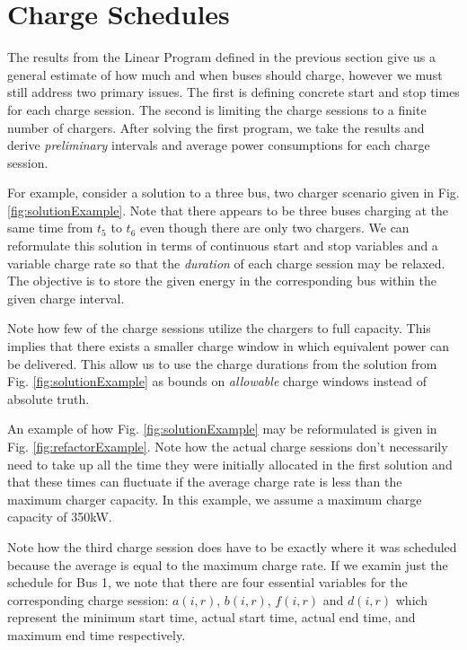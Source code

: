 



\section{Charge Schedules}
The results from the Linear Program defined in the previous section give us a general estimate of how much and when buses should charge, however we must still address two primary issues. The first is defining concrete start and stop times for each charge session. The second is limiting the charge sessions to a finite number of chargers. After solving the first program, we take the results and derive {\it preliminary} intervals and average power consumptions for each charge session.  
\par For example, consider a solution to a three bus, two charger scenario given in Fig. \ref{fig:solutionExample}.
Note that there appears to be three buses charging at the same time from $t_5$ to $t_6$ even though there are only two chargers.  We can reformulate this solution in terms of continuous start and stop variables and a variable charge rate so that the {\it duration} of each charge session may be relaxed. The objective is to store the given energy in the corresponding bus within the given charge interval.  
\par Note how few of the charge sessions utilize the chargers to full capacity. This implies that there exists a smaller charge window in which equivalent power can be delivered. This allow us to use the charge durations from the solution from Fig. \ref{fig:solutionExample} as bounds on {\it allowable} charge windows instead of absolute truth. 
\par An example of how Fig. \ref{fig:solutionExample} may be reformulated is given in Fig. \ref{fig:refactorExample}. Note how the actual charge sessions don't necessarily need to take up all the time they were initially allocated in the first solution and that these times can fluctuate if the average charge rate is less than the maximum charger capacity. In this example, we assume a maximum charge capacity of 350kW.  
\par Note how the third charge session does have to be exactly where it was scheduled because the average is equal to the maximum charge rate.
If we examin just the schedule for Bus 1, we note that there are four essential variables for the corresponding charge session: $a(i,r)$, $b(i,r)$, $f(i,r)$ and $d(i,r)$ which represent the minimum start time, actual start time, actual end time, and maximum end time respectively. 
